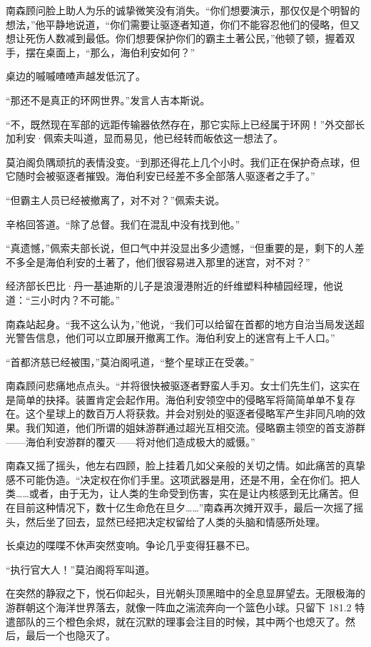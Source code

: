\documentclass[AutoFakeBold=true]{book}
\begin{document}
南森顾问脸上助人为乐的诚挚微笑没有消失。``你们想要演示，那仅仅是个明智的想法，''他平静地说道，``你们需要让驱逐者知道，你们不能容忍他们的侵略，但又想让死伤人数减到最低。你们想要保护你们的霸主土著公民，''他顿了顿，握着双手，摆在桌面上，``那么，海伯利安如何？''

桌边的嘁嘁喳喳声越发低沉了。

``那还不是真正的环网世界。''发言人吉本斯说。

``不，既然现在军部的远距传输器依然存在，那它实际上已经属于环网！''外交部长加利安·佩索夫叫道，显而易见，他已经转而皈依这一想法了。

莫泊阁负隅顽抗的表情没变。``到那还得花上几个小时。我们正在保护奇点球，但它随时会被驱逐者摧毁。海伯利安已经差不多全部落人驱逐者之手了。''

``但霸主人员已经被撤离了，对不对？''佩索夫说。

辛格回答道。``除了总督。我们在混乱中没有找到他。''

``真遗憾，''佩索夫部长说，但口气中并没显出多少遗憾，``但重要的是，剩下的人差不多全是海伯利安的土著了，他们很容易进入那里的迷宫，对不对？''

经济部长巴比·丹一基迪斯的儿子是浪漫港附近的纤维塑料种植园经理，他说道：``三小时内？不可能。''

南森站起身。``我不这么认为，''他说，``我们可以给留在首都的地方自治当局发送超光警告信息，他们可以立即展开撤离工作。海伯利安上的迷宫有上千人口。''

``首都济慈已经被围，''莫泊阁吼道，``整个星球正在受袭。''

南森顾问悲痛地点点头。``并将很快被驱逐者野蛮人手刃。女士们先生们，这实在是简单的抉择。装置肯定会起作用。海伯利安领空中的侵略军将简简单单不复存在。这个星球上的数百万人将获救。并会对别处的驱逐者侵略军产生非同凡响的效果。我们知道，他们所谓的姐妹游群通过超光互相交流。侵略霸主领空的首支游群——海伯利安游群的覆灭——将对他们造成极大的威慑。''

南森又摇了摇头，他左右四顾，脸上挂着几如父亲般的关切之情。如此痛苦的真挚感不可能伪造。``决定权在你们手里。这项武器是用，还是不用，全在你们。把人类……或者，由于无为，让人类的生命受到伤害，实在是让内核感到无比痛苦。但在目前这种情况下，数十亿生命危在旦夕……''南森再次摊开双手，最后一次摇了摇头，然后坐了回去，显然已经把决定权留给了人类的头脑和情感所处理。

长桌边的喋喋不休声突然变响。争论几乎变得狂暴不已。

``执行官大人！''莫泊阁将军叫道。

在突然的静寂之下，悦石仰起头，目光朝头顶黑暗中的全息显屏望去。无限极海的游群朝这个海洋世界落去，就像一阵血之湍流奔向一个篮色小球。只留下 181.2 特遣部队的三个橙色余烬，就在沉默的理事会注目的时候，其中两个也熄灭了。然后，最后一个也隐灭了。
\end{document}
